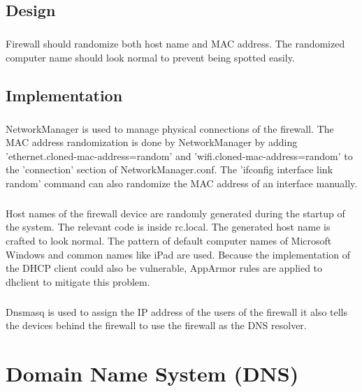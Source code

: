\documentclass[mscthesis]{usiinfthesis}
\begin{document}
\section{Design}
\paragraph{}
Firewall should randomize both host name and MAC address. The randomized computer name should look normal to prevent being spotted easily.


\section{Implementation}
\paragraph{}
NetworkManager is used to manage physical connections of the firewall. The MAC address randomization is done by NetworkManager by adding 'ethernet.cloned-mac-address=random' and 'wifi.cloned-mac-address=random' to the 'connection' section of NetworkManager.conf. The 'ifconfig interface link random' command can also randomize the MAC address of an interface manually.
\paragraph{}
Host names of the firewall device are randomly generated during the startup of the system. The relevant code is inside rc.local. The generated host name is crafted to look normal. The pattern of default computer names of Microsoft Windows and common names like iPad are used. Because the implementation of the DHCP client could also be vulnerable, AppArmor rules are applied to dhclient to mitigate this problem.
\paragraph{}
Dnsmasq is used to assign the IP address of the users of the firewall it also tells the devices behind the firewall to use the firewall as the DNS resolver.

\chapter{Domain Name System (DNS)}
\end{document}
